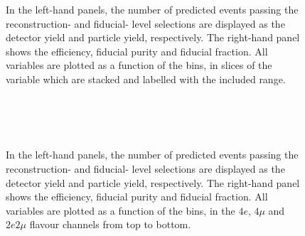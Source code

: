 \begin{figure}[htb]
  \centering 
  \\
\vspace{-1cm}
  \\
\vspace{-1cm}
  \\
\vspace{-1cm}
  \\
\vspace{-1cm}
  \\
\vspace{-0.5cm}
\caption{In the left-hand panels, the number of predicted events passing the reconstruction- and fiducial- level selections are displayed as the detector yield and particle yield, respectively. The right-hand panel shows the efficiency, fiducial purity and fiducial fraction. All variables are plotted as a function of the \mFourL bins, in slices of the \yFourL variable which are stacked and labelled with the included \yFourL range.
  \label{fig:y4lunf}}
 \end{figure}  

\FloatBarrier
\clearpage

\begin{figure}[htb]
  \centering 
  \\
  \\
  \\
\caption{In the left-hand panels, the number of predicted events passing the reconstruction- and fiducial- level selections are displayed as the detector yield and particle yield, respectively. The right-hand panel shows the efficiency, fiducial purity and fiducial fraction. All variables are plotted as a function of the \mFourL bins, in the $4e$, $4\mu$ and $2e2\mu$ flavour channels from top to bottom.
  \label{fig:chunf}}
 \end{figure}  


